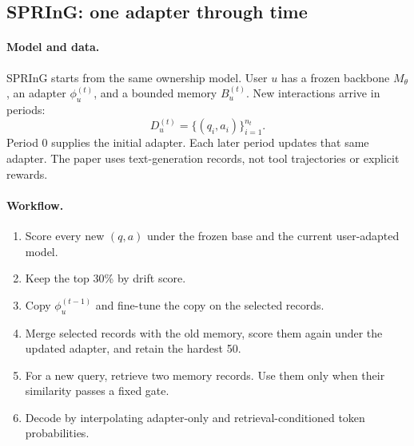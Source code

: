 \subsection{SPRInG: one adapter through time}

\paragraph{Model and data.}
SPRInG starts from the same ownership model.  User $u$ has a frozen backbone
$M_\theta$, an adapter $\phi_u^{(t)}$, and a bounded memory
$B_u^{(t)}$.  New interactions arrive in periods:
\begin{equation}
  D_u^{(t)}=\{(q_i,a_i)\}_{i=1}^{n_t}.
  \label{eq:spring-stream}
\end{equation}
Period 0 supplies the initial adapter.  Each later period updates that same
adapter.  The paper uses text-generation records, not tool trajectories or
explicit rewards.

\paragraph{Workflow.}
\begin{enumerate}
  \item Score every new $(q,a)$ under the frozen base and the current
  user-adapted model.
  \item Keep the top 30\% by drift score.
  \item Copy $\phi_u^{(t-1)}$ and fine-tune the copy on the selected records.
  \item Merge selected records with the old memory, score them again under
  the updated adapter, and retain the hardest 50.
  \item For a new query, retrieve two memory records.  Use them only when
  their similarity passes a fixed gate.
  \item Decode by interpolating adapter-only and retrieval-conditioned token
  probabilities.
\end{enumerate}

